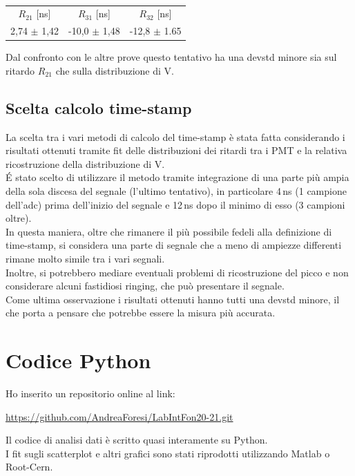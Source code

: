 \documentclass[a4paper,twocolumn]{article}
\begin{document}
\begin{table}[H]
\begin{tabular}{c|c|c}
$R_{21}$ [ns] & $R_{31}$ [ns] & $R_{32}$ [ns] \\
\hfill
2,74 $\pm$ 1,42 & -10,0 $\pm$ 1,48 & -12,8 $\pm$ 1.65
\hfill
\end{tabular}
\caption{}
\label{tab:RitForeA}
\end{table}

Dal confronto con le altre prove questo tentativo ha una devstd minore sia sul ritardo $R_{21}$ che sulla distribuzione di V.

\subsection{Scelta calcolo time-stamp}
\label{sec:AScelta}
La scelta tra i vari metodi di calcolo del time-stamp è stata fatta considerando i risultati ottenuti tramite fit delle distribuzioni dei ritardi tra i PMT e la relativa ricostruzione della distribuzione di V.\\
\'E stato scelto di utilizzare il metodo tramite integrazione di una parte più ampia della sola discesa del segnale (l'ultimo tentativo), in particolare 4\,ns (1 campione dell'adc) prima dell'inizio del segnale e 12\,ns dopo il minimo di esso (3 campioni oltre).\\
In questa maniera, oltre che rimanere il più possibile fedeli alla definizione di time-stamp, si considera una parte di segnale che a meno di ampiezze differenti rimane molto simile tra i vari segnali.\\
Inoltre, si potrebbero mediare eventuali problemi di ricostruzione del picco e non considerare alcuni fastidiosi ringing, che può presentare il segnale.\\
Come ultima osservazione i risultati ottenuti hanno tutti una devstd minore, il che porta a pensare che potrebbe essere la misura più accurata.

\section{Codice Python}
\label{sec:ARep}
Ho inserito un repositorio online al link:
\begin{center}
\url{https://github.com/AndreaForesi/LabIntFon20-21.git}
\end{center}
Il codice di analisi dati è scritto quasi interamente su Python.\\
I fit sugli scatterplot e altri grafici sono stati riprodotti utilizzando Matlab o Root-Cern.
\end{document}
